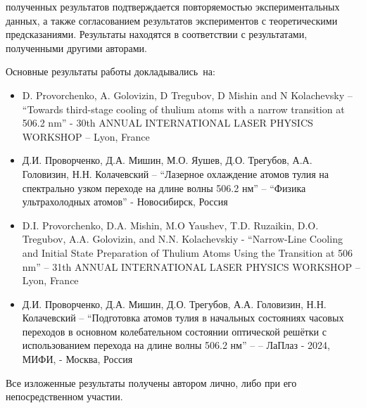{\reliability} полученных результатов подтверждается повторяемостью экспериментальных данных, а также согласованием результатов экспериментов с теоретическими предсказаниями. Результаты находятся в соответствии с результатами, полученными другими авторами.

{\probation}
Основные результаты работы докладывались~на:
\begin{itemize}
	\item D. Provorchenko, A. Golovizin, D Tregubov, D Mishin and N Kolachevsky – “Towards third-stage cooling of thulium atoms with a narrow transition at 506.2 nm” - 30th ANNUAL INTERNATIONAL LASER PHYSICS WORKSHOP – Lyon, France
	\item Д.И. Проворченко, Д.А. Мишин, М.О. Яушев, Д.О. Трегубов, А.А. Головизин, Н.Н. Колачевский – “Лазерное охлаждение атомов тулия на спектрально узком переходе на длине волны 506.2 нм” – “Физика ультрахолодных атомов” - Новосибирск, Россия
	\item D.I. Provorchenko, D.A. Mishin, M.O Yaushev, T.D. Ruzaikin, D.O. Tregubov, A.A. Golovizin, and N.N. Kolachevskiy  - “Narrow-Line Cooling and Initial State Preparation of Thulium Atoms Using the Transition at 506 nm” -- 31th ANNUAL INTERNATIONAL LASER PHYSICS WORKSHOP – Lyon, France
	\item Д.И. Проворченко, Д.А. Мишин, Д.О. Трегубов,
	А.А. Головизин, Н.Н. Колачевский – “Подготовка атомов тулия в начальных состояниях часовых переходов в основном колебательном состоянии оптической решётки с использованием перехода на длине волны 506.2 нм” –  – ЛаПлаз - 2024, МИФИ, - Москва, Россия
\end{itemize}

{\contribution} Все изложенные результаты получены автором лично, либо при его непосредственном участии. 

